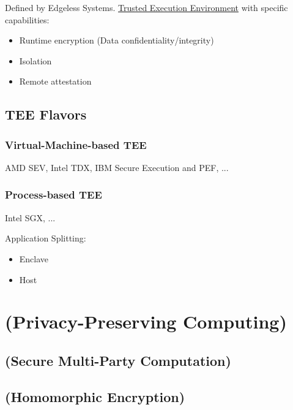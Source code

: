 Defined by Edgeless Systems. \hyperref[sec:TEE]{Trusted Execution Environment}
with specific capabilities:

\begin{itemize}
  \item Runtime encryption (Data confidentiality/integrity)
  \item Isolation
  \item Remote attestation
\end{itemize}

\section{TEE Flavors}

\subsection{Virtual-Machine-based TEE}

AMD SEV, Intel TDX, IBM Secure Execution and PEF, ...

\subsection{Process-based TEE}

Intel SGX, ...

Application Splitting:

\begin{itemize}
  \item Enclave
  \item Host
\end{itemize}


\chapter{(Privacy-Preserving Computing)}
\label{ch:privacy-preserving-computing}

\section{(Secure Multi-Party Computation)}

\section{(Homomorphic Encryption)}

